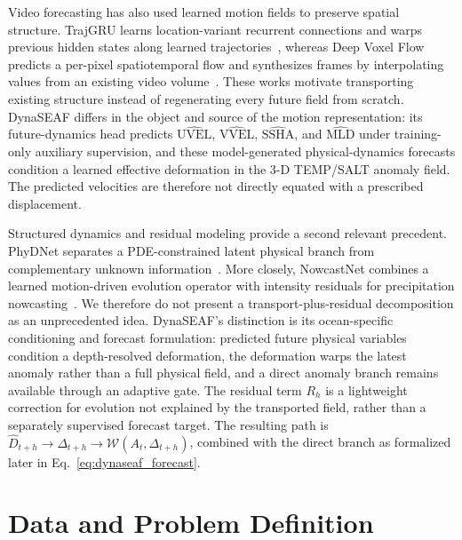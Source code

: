 \documentclass[conference]{IEEEtran}
\begin{document}
Video forecasting has also used learned motion fields to preserve spatial structure. TrajGRU learns location-variant recurrent connections and warps previous hidden states along learned trajectories~\cite{shi2017trajgru}, whereas Deep Voxel Flow predicts a per-pixel spatiotemporal flow and synthesizes frames by interpolating values from an existing video volume~\cite{liu2017voxel}. These works motivate transporting existing structure instead of regenerating every future field from scratch. DynaSEAF differs in the object and source of the motion representation: its future-dynamics head predicts $\widehat{\mathrm{UVEL}}$, $\widehat{\mathrm{VVEL}}$, $\widehat{\mathrm{SSHA}}$, and $\widehat{\mathrm{MLD}}$ under training-only auxiliary supervision, and these model-generated physical-dynamics forecasts condition a learned effective deformation in the 3-D TEMP/SALT anomaly field. The predicted velocities are therefore not directly equated with a prescribed displacement.

Structured dynamics and residual modeling provide a second relevant precedent. PhyDNet separates a PDE-constrained latent physical branch from complementary unknown information~\cite{leguen2020phydnet}. More closely, NowcastNet combines a learned motion-driven evolution operator with intensity residuals for precipitation nowcasting~\cite{zhang2023nowcastnet}. We therefore do not present a transport-plus-residual decomposition as an unprecedented idea. DynaSEAF's distinction is its ocean-specific conditioning and forecast formulation: predicted future physical variables condition a depth-resolved deformation, the deformation warps the latest anomaly rather than a full physical field, and a direct anomaly branch remains available through an adaptive gate. The residual term $R_h$ is a lightweight correction for evolution not explained by the transported field, rather than a separately supervised forecast target. The resulting path is $\widehat{D}_{t+h}\!\rightarrow\!\Delta_{t+h}\!\rightarrow\!\mathcal{W}(A_t,\Delta_{t+h})$, combined with the direct branch as formalized later in Eq.~\eqref{eq:dynaseaf_forecast}.

\section{Data and Problem Definition}
\end{document}
